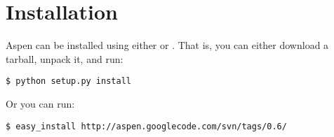 \chapter{Installation \label{installation}}

Aspen can be installed using either  or .
That is, you can either download a tarball, unpack it, and run:

\begin{verbatim}
$ python setup.py install
\end{verbatim}

Or you can run:

\begin{verbatim}
$ easy_install http://aspen.googlecode.com/svn/tags/0.6/
\end{verbatim}
